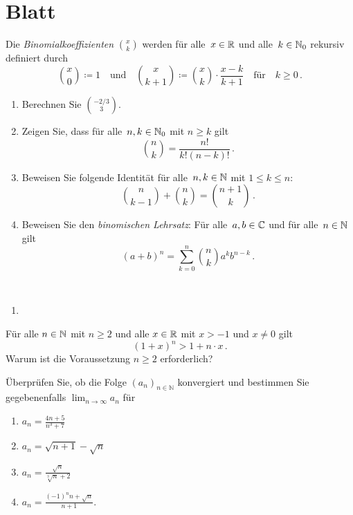 \section{Blatt}

\begin{aufg}[8 Punkte] 
Die \textit{Binomialkoeffizienten} ${x\choose k}$ werden f\"ur alle~$x\in \mathbb{R}$ und alle~$ k\in \mathbb{N}_0$ rekursiv definiert durch 
\[
{ x\choose 0 } \coloneqq 1 \quad\text{und} \quad {x\choose k+1} \coloneqq {x\choose k }\cdot\frac{x-k}{k+1} \quad\text{f\"ur} \quad k\geq 0\,.
\]
\begin{enumerate}[label=$\mathrm{(\roman*)}$, ref=$\mathrm{\roman*}$]
\item Berechnen Sie ${-2/3 \choose 3}$.
\item Zeigen Sie, dass f\"ur alle~$n, k\in \mathbb{N}_0$ mit $n\geq k$ gilt
\[
{ n \choose k } = \frac{n!}{k!(n-k)!}\,. 
\]
\item Beweisen Sie folgende Identit\"at f\"ur alle~$n, k\in \mathbb{N}$ mit $1\leq k\leq n$:
\[
{ n \choose k-1 } + { n \choose k } = { n+1 \choose k }\,.
\]
\item Beweisen Sie den \textit{binomischen Lehrsatz}: F\"ur alle~$a,b\in \mathbb{C}$ und f\"ur alle~$n\in \mathbb{N}$ gilt
\[
(a+b)^{n} = \sum_{k=0}^{n} { n \choose k }a^{k}b^{n-k}\,.  
\]
\end{enumerate}
\end{aufg}


\bigskip

\begin{lsg}\mbox{ }
\begin{enumerate}[label=$\mathrm{(\roman*)}$, ref=$\mathrm{\roman*}$]
\item 
\end{enumerate}
\end{lsg}

\bigskip



\begin{aufg}[4 Punkte]
Für alle $n\in \mathbb{N}$ mit $n\ge2$ und alle $x\in\mathbb{R}$ mit $x>-1$ und $x\neq0$ gilt 
\[
(1+x)^n> 1+n\cdot x\,.
\]
Warum ist die Voraussetzung $n\ge2$ erforderlich?
\end{aufg}
 

\bigskip

\begin{lsg}
\end{lsg}


\bigskip


\begin{aufg}[6 Punkte]
\"Uberpr\"ufen Sie, ob die Folge $ (a_{n})_{n\in \mathbb{N}} $ konvergiert und bestimmen Sie gegebenenfalls $\lim_{n\to\infty} a_{n} $ f\"ur 
\begin{enumerate}[label=$\mathrm{(\roman*)}$, ref=$\mathrm{\roman*}$]
\setlength{\itemsep}{2pt}
\item $a_{n} = \frac{4n + 5}{n^{3}+7}$
\item $a_{n} = \sqrt{n+1} - \sqrt{n}$
\item $a_{n} = \frac{\sqrt{n}}{\sqrt[3]{n}+2}$
\item $a_{n} = \frac{(-1)^{n}n + \sqrt{n}}{n+1}$.
\end{enumerate}
\end{aufg}


